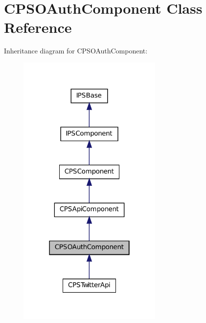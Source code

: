 \hypertarget{classCPSOAuthComponent}{
\section{CPSOAuthComponent Class Reference}
\label{classCPSOAuthComponent}
}


Inheritance diagram for CPSOAuthComponent:\nopagebreak
\begin{figure}[H]
\begin{center}
\leavevmode
\includegraphics[width=202pt]{classCPSOAuthComponent__inherit__graph}
\end{center}
\end{figure}


